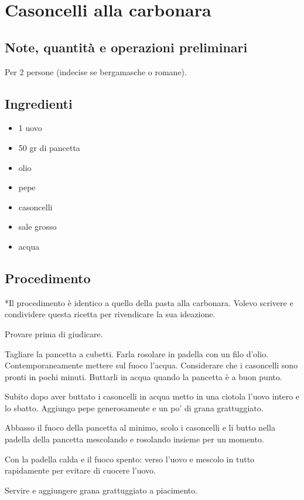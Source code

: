 \documentclass[12pt]{article}
\begin{document}
\newpage


\section{Casoncelli alla carbonara}

\subsection*{Note, quantità e operazioni preliminari}
Per 2 persone (indecise se bergamasche o romane).

\bigskip
\bigskip

\begin{multicols}{2}
\subsection*{Ingredienti}
\begin{itemize}
	\item 1 uovo
	\item 50 gr di pancetta
	\item olio
	\item pepe
	\item casoncelli
	\item sale grosso
	\item acqua
\end{itemize}

\vspace*{\fill}

\columnbreak
\subsection*{Procedimento}
*Il procedimento è identico a quello della pasta alla carbonara.
Volevo scrivere e condividere questa ricetta per rivendicare la sua ideazione.
\medskip

Provare prima di giudicare.
\medskip

Tagliare la pancetta a cubetti. Farla rosolare in padella con un filo d'olio.
Contemporaneamente mettere sul fuoco l'acqua.
Considerare che i casoncelli sono pronti in pochi minuti.
Buttarli in acqua quando la pancetta è a buon punto.
\medskip

Subito dopo aver buttato i casoncelli in acqua metto in una ciotola 
l'uovo intero e lo sbatto. Aggiungo pepe generosamente e un po' di grana grattuggiato.
\medskip

Abbasso il fuoco della pancetta al minimo, scolo i casoncelli e li butto nella padella della 
pancetta mescolando e rosolando insieme per un momento.
\medskip

Con la padella calda e il fuoco spento: verso l'uovo e mescolo in tutto rapidamente
per evitare di cuocere l'uovo.
\medskip

Servire e aggiungere grana grattuggiato a piacimento.

\end{multicols}

\newpage
\end{document}

